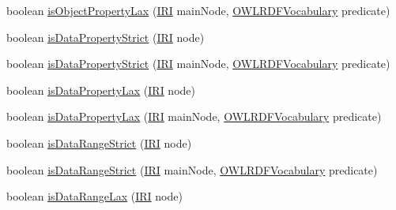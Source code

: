 \begin{DoxyCompactItemize}
\item 
boolean \hyperlink{classorg_1_1coode_1_1owlapi_1_1rdfxml_1_1parser_1_1_abstract_triple_handler_afc9d13a94026e57124d89e42ef9972a3}{is\-Object\-Property\-Lax} (\hyperlink{classorg_1_1semanticweb_1_1owlapi_1_1model_1_1_i_r_i}{I\-R\-I} main\-Node, \hyperlink{enumorg_1_1semanticweb_1_1owlapi_1_1vocab_1_1_o_w_l_r_d_f_vocabulary}{O\-W\-L\-R\-D\-F\-Vocabulary} predicate)
\item 
boolean \hyperlink{classorg_1_1coode_1_1owlapi_1_1rdfxml_1_1parser_1_1_abstract_triple_handler_a5c260005675c49ac34f2f11b00b1ea26}{is\-Data\-Property\-Strict} (\hyperlink{classorg_1_1semanticweb_1_1owlapi_1_1model_1_1_i_r_i}{I\-R\-I} node)
\item 
boolean \hyperlink{classorg_1_1coode_1_1owlapi_1_1rdfxml_1_1parser_1_1_abstract_triple_handler_a7f80f5a0713ba000388373b0b9e73340}{is\-Data\-Property\-Strict} (\hyperlink{classorg_1_1semanticweb_1_1owlapi_1_1model_1_1_i_r_i}{I\-R\-I} main\-Node, \hyperlink{enumorg_1_1semanticweb_1_1owlapi_1_1vocab_1_1_o_w_l_r_d_f_vocabulary}{O\-W\-L\-R\-D\-F\-Vocabulary} predicate)
\item 
boolean \hyperlink{classorg_1_1coode_1_1owlapi_1_1rdfxml_1_1parser_1_1_abstract_triple_handler_a76d41afb518a9738664920455f3d90cc}{is\-Data\-Property\-Lax} (\hyperlink{classorg_1_1semanticweb_1_1owlapi_1_1model_1_1_i_r_i}{I\-R\-I} node)
\item 
boolean \hyperlink{classorg_1_1coode_1_1owlapi_1_1rdfxml_1_1parser_1_1_abstract_triple_handler_a07aba8bc148b1a44cdac28217725ac0b}{is\-Data\-Property\-Lax} (\hyperlink{classorg_1_1semanticweb_1_1owlapi_1_1model_1_1_i_r_i}{I\-R\-I} main\-Node, \hyperlink{enumorg_1_1semanticweb_1_1owlapi_1_1vocab_1_1_o_w_l_r_d_f_vocabulary}{O\-W\-L\-R\-D\-F\-Vocabulary} predicate)
\item 
boolean \hyperlink{classorg_1_1coode_1_1owlapi_1_1rdfxml_1_1parser_1_1_abstract_triple_handler_af3bbbef99b5decb2f4bdd821346636bd}{is\-Data\-Range\-Strict} (\hyperlink{classorg_1_1semanticweb_1_1owlapi_1_1model_1_1_i_r_i}{I\-R\-I} node)
\item 
boolean \hyperlink{classorg_1_1coode_1_1owlapi_1_1rdfxml_1_1parser_1_1_abstract_triple_handler_a05d86f51fcb094c4d62d8539d523ce6c}{is\-Data\-Range\-Strict} (\hyperlink{classorg_1_1semanticweb_1_1owlapi_1_1model_1_1_i_r_i}{I\-R\-I} main\-Node, \hyperlink{enumorg_1_1semanticweb_1_1owlapi_1_1vocab_1_1_o_w_l_r_d_f_vocabulary}{O\-W\-L\-R\-D\-F\-Vocabulary} predicate)
\item 
boolean \hyperlink{classorg_1_1coode_1_1owlapi_1_1rdfxml_1_1parser_1_1_abstract_triple_handler_ae0e362e4ab8b0dac6ed95de95a93f2f5}{is\-Data\-Range\-Lax} (\hyperlink{classorg_1_1semanticweb_1_1owlapi_1_1model_1_1_i_r_i}{I\-R\-I} node)

\end{DoxyCompactItemize}
